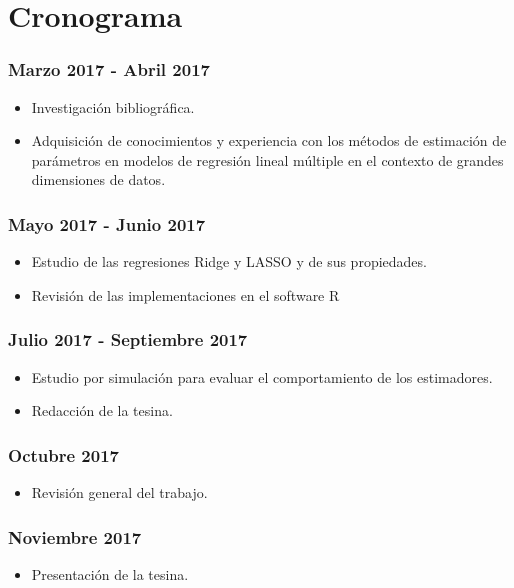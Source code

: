 \documentclass[a4paper,12pt]{article}
\begin{document}
\section{Cronograma}
\subsubsection*{Marzo 2017 - Abril 2017}
\begin{itemize}
\item Investigación bibliográfica.

\item Adquisición de conocimientos y experiencia con los métodos de estimación de parámetros en modelos de regresión lineal múltiple en el contexto de grandes dimensiones de datos.

\end{itemize}

\subsubsection*{Mayo 2017 - Junio 2017}
\begin{itemize}
\item Estudio de las regresiones Ridge y LASSO y de sus propiedades.

\item Revisión de las implementaciones en el software R

\end{itemize}

\subsubsection*{Julio 2017 - Septiembre 2017}
\begin{itemize}
\item Estudio por simulación para evaluar el comportamiento de los estimadores.

\item Redacción de la tesina.
\end{itemize}

\subsubsection*{Octubre 2017}
\begin{itemize}
\item Revisión general del trabajo.

\end{itemize}

\subsubsection*{Noviembre 2017}
\begin{itemize}
\item Presentación de la tesina.

\end{itemize}

\renewcommand{\refname}{Bibliografía}


\end{document}
